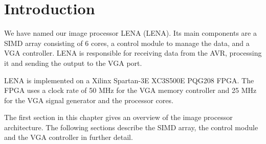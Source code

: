 \section{Introduction}

We have named our image processor \acs{LENA} (\acl{LENA}). Its main
components are a \ac{SIMD} array consisting of 6 cores, a control module
to manage the data, and a \ac{VGA} controller. \ac{LENA} is responsible
for receiving data from the AVR, processing it and sending the output to
the \ac{VGA} port.

LENA is implemented on a Xilinx Spartan-3E XC3S500E PQG208 FPGA. The
FPGA uses a clock rate of 50 MHz for the VGA memory controller and 25
MHz for the VGA signal generator and the processor cores.

The first section in this chapter gives an overview of the image
processor architecture. The following sections describe the SIMD array,
the control module and the VGA controller in further detail.

